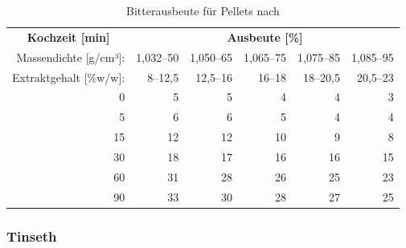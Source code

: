 \documentclass[a4paper,parskip=half]{scrartcl}
\begin{document}
\begin{table}[H]
\centering
\begin{tabular}{rrrrrr} 
\toprule
\multicolumn{1}{c}{\textbf{Kochzeit [min]}} & \multicolumn{5}{c}{\textbf{Ausbeute [\%]}}                                 \\
Massendichte [g/cm³]:                    & 1,032–50 & 1,050–65 & 1,065–75 & 1,075–85 & 1,085–95  \\
Extraktgehalt [\%w/w]:                    & 8–12,5 & 12,5–16 & 16–18 & 18–20,5 & 20,5–23  \\
\midrule
0                                            & 5        & 5        & 4                            & 4                            & 3                             \\
5                                            & 6        & 6        & 5                            & 4                            & 4                             \\
15                                           & 12       & 12       & 10                           & 9                            & 8                             \\
30                                           & 18       & 17       & 16                           & 16                           & 15                            \\
60                                           & 31       & 28       & 26                           & 25                           & 23                            \\
90                                           & 33       & 30       & 28                           & 27                           & 25                     \\
\bottomrule
\end{tabular}
\caption{Bitterausbeute für Pellets nach \citeauthor{Noonan1996} \parencite[215]{Noonan1996}}
\label{table:noonanutilpellets}
\end{table}

\subsubsection*{Tinseth}
\end{document}

